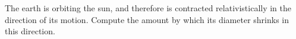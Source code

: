 The earth is orbiting the sun, and therefore is contracted relativistically in the
direction of its motion. Compute the amount by which its diameter shrinks in this
direction.\answercheck\hwendpart
